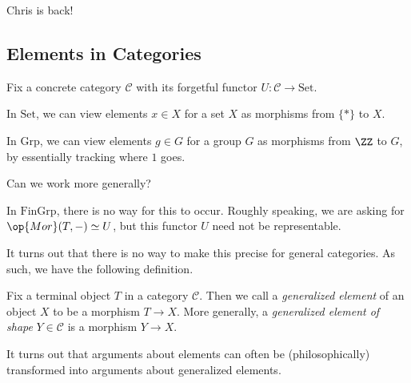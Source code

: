 
Chris is back!

\subsection{Elements in Categories}
Fix a concrete category $\mathcal C$ with its forgetful functor $U:\mathcal C\to\mathrm{Set}$.
\begin{example}
	In $\mathrm{Set}$, we can view elements $x\in X$ for a set $X$ as morphisms from $\{*\}$ to $X$.
\end{example}
\begin{example}
	In $\mathrm{Grp}$, we can view elements $g\in G$ for a group $G$ as morphisms from $\ZZ$ to $G$, by essentially tracking where $1$ goes.
\end{example}
Can we work more generally?
\begin{nex}
	In $\mathrm{FinGrp}$, there is no way for this to occur. Roughly speaking, we are asking for $\op{Mor}(T,-)\simeq U$, but this functor $U$ need not be representable.
\end{nex}
It turns out that there is no way to make this precise for general categories. As such, we have the following definition.
\begin{definition}
	Fix a terminal object $T$ in a category $\mathcal C$. Then we call a \textit{generalized element} of an object $X$ to be a morphism $T\to X$. More generally, a \textit{generalized element of shape} $Y\in\mathcal C$ is a morphism $Y\to X$.
\end{definition}
It turns out that arguments about elements can often be (philosophically) transformed into arguments about generalized elements.


